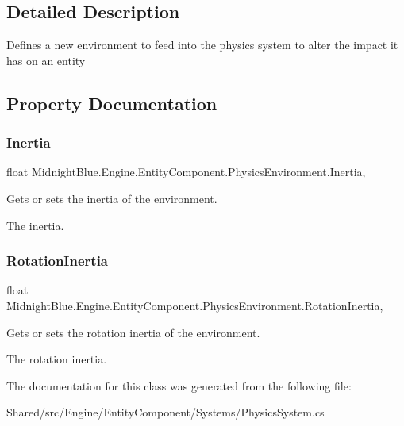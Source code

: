 \subsection{Detailed Description}
Defines a new environment to feed into the physics system to alter the impact it has on an entity 



\subsection{Property Documentation}
\hypertarget{class_midnight_blue_1_1_engine_1_1_entity_component_1_1_physics_environment_ab10f12cb0c2f4a7117b31ef30fe9aee9}{}\label{class_midnight_blue_1_1_engine_1_1_entity_component_1_1_physics_environment_ab10f12cb0c2f4a7117b31ef30fe9aee9} 
\subsubsection{\texorpdfstring{Inertia}{Inertia}}
{\footnotesize\ttfamily float Midnight\+Blue.\+Engine.\+Entity\+Component.\+Physics\+Environment.\+Inertia\hspace{0.3cm}{\ttfamily [get]}, {\ttfamily [set]}}



Gets or sets the inertia of the environment. 

The inertia.\hypertarget{class_midnight_blue_1_1_engine_1_1_entity_component_1_1_physics_environment_ae639fde9c7426767082623ffba336e0c}{}\label{class_midnight_blue_1_1_engine_1_1_entity_component_1_1_physics_environment_ae639fde9c7426767082623ffba336e0c} 
\subsubsection{\texorpdfstring{Rotation\+Inertia}{RotationInertia}}
{\footnotesize\ttfamily float Midnight\+Blue.\+Engine.\+Entity\+Component.\+Physics\+Environment.\+Rotation\+Inertia\hspace{0.3cm}{\ttfamily [get]}, {\ttfamily [set]}}



Gets or sets the rotation inertia of the environment. 

The rotation inertia.

The documentation for this class was generated from the following file\+:\begin{DoxyCompactItemize}
\item 
Shared/src/\+Engine/\+Entity\+Component/\+Systems/Physics\+System.\+cs\end{DoxyCompactItemize}
